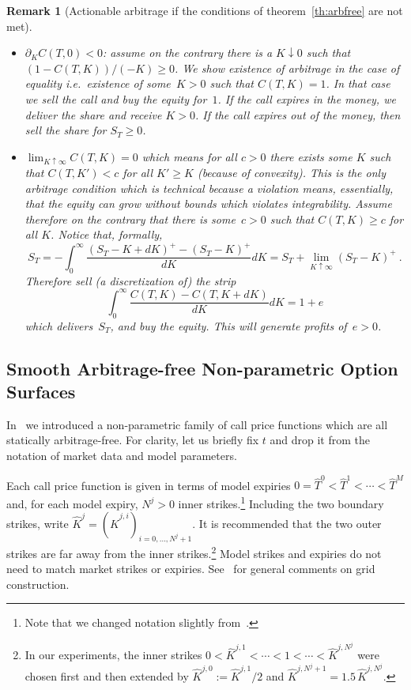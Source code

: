 \documentclass[11pt,a4paper]{article}
\newtheorem{remark}[definition]{Remark}
\begin{document}
\begin{remark}[Actionable arbitrage if the conditions of theorem~\ref{th:arbfree} are not met]
\begin{itemize}
    \item $\partial_K C(T,0)<0$: assume on the contrary there is a $K\downarrow 0$
    such that $(1-C(T,K))/(-K) \geq 0$. We show existence of
    arbitrage in the case of equality
    i.e.~existence of some~$K>0$ such that $C(T,K)=1$.
    In that case we sell the call and buy the equity for~$1$.
    If the call expires in the money, we deliver the share
    and receive $K>0$. If the call expires out of the money, then sell
    the share for $S_T\geq 0$.

    \item $\lim_{K\uparrow \infty} C(T,K) = 0$ which means for all $c>0$
    there exists some $K$ such that $C(T,K')<c$ for all $K'\geq K$ (because of convexity).
    This is the only arbitrage condition which is technical because a violation means, 
    essentially, that the equity can grow without bounds which violates
    integrability.
    Assume therefore on the contrary 
    that there is some~$c>0$ such that $C(T,K)\geq c$ for all $K$. 
    Notice that, formally,
    $$
        S_T = - \int_0^\infty \frac{ (S_T-K+dK)^+ - (S_T-K)^+ }{ dK } dK
            = S_T + \lim_{K\uparrow \infty} (S_T-K)^+ \ .
    $$
    Therefore sell (a discretization of) the strip
    $$
    \int_0^\infty \frac{ C(T,K) -  C(T,K+dK) }{ dK } dK = 1 + e
    $$
    which delivers~$S_T$, and buy the equity. This will generate profits of~$e>0$.
 \end{itemize}
\end{remark}

\subsection{Smooth Arbitrage-free Non-parametric Option Surfaces}
\label{sec:sanos}

In~\citet{SANOS2026} we introduced a non-parametric family
of call price functions which are all statically arbitrage-free. For clarity, let us briefly fix $t$ and drop it from the notation of market data
and model parameters.

Each call price function is given in terms of model expiries
$0 = \hat T^0 < \hat T^1 < \cdots < \hat T^M$ and, for each model expiry,
$N^j>0$ inner strikes.\footnote{Note that we changed notation slightly from~\citet{SANOS2026}.}  Including the two boundary strikes, write
$\hat K^j = (\hat K^{j,i})_{i=0,\ldots,N^j+1}$. It is recommended that the two outer strikes
are far away from the inner strikes.\footnote{
    In our experiments, the inner strikes
    $0<\hat K^{j,1}<\cdots<1<\cdots<\hat K^{j,N^j}$
    were chosen first and then extended by $\hat K^{j,0}:=\hat K^{j,1}/2$ and
    $\hat K^{j,N^j+1} = 1.5\,\hat K^{j,N^j}$.
}  Model strikes and expiries do not need to match
market strikes or expiries. See~\citet{SANOS2026} for general comments on grid construction.
\end{document}
